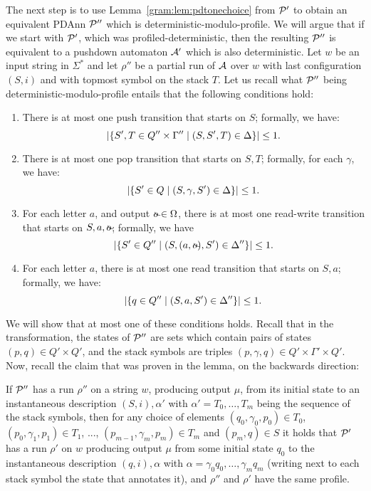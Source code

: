 The next step is to use Lemma~\ref{gram:lem:pdtonechoice} from $\mathcal{P}'$ to obtain an equivalent PDAnn $\mathcal{P}''$ which is deterministic-modulo-profile. We will argue that if we start with $\mathcal{P}'$, which was profiled-deterministic, then the resulting $\mathcal{P}''$ is equivalent to a pushdown automaton $\mathcal{A}'$ which is also deterministic. Let $w$ be an input string in $\Sigma^*$ and let $\rho''$ be a partial run of $\mathcal{A}$ over $w$ with last configuration $(S, i)$ and with topmost symbol on the stack $T$. Let us recall what $\mathcal{P}''$ being deterministic-modulo-profile entails that the following conditions hold:
  \begin{enumerate}
	\item There is at most one push transition that
	starts on $S$; formally, we have:
        \[\left|\{S', T \in Q'' \times \Gamma'' \mid
                (S, S', T) \in \Delta\}\right| \leq 1.\]
	\item There is at most
	one pop transition that starts on $S,T$; formally, for each $\gamma$, we
        have:
        \[\left|\{S'
                \in Q \mid (S, \gamma, S') \in \Delta\}\right| \leq 1.\]
	\item For each letter $a$, and output $\oout \in \Omega$, there is at most one read-write transition that starts on
          $S,a,\oout$; formally, we have \[\card{\{S' \in Q'' \mid (S,(a,\oout),S') \in \Delta''\}}
        \leq 1.\]
	\item For each letter $a$, there is at most one read transition that starts on
          $S,a$; formally, we have: \[\left|\{q \in Q'' \mid (S,a,S') \in \Delta''\}\right|
        \leq 1.\]
\end{enumerate}
We will show that at most one of these conditions holds. Recall that in the transformation, the states of $\mathcal{P}''$ are sets which contain pairs of states $(p,q)\in Q'\times Q'$, and the stack symbols are triples $(p, \gamma, q)\in Q'\times\Gamma' \times Q'$. Now, recall the claim that was proven in the lemma, on the backwards direction:

If $\mathcal{P}''$ has a run $\rho''$ on a string $w$, producing output $\mu$, from its initial state to an instantaneous
description $(S, i), \alpha'$ with $\alpha' =
T_0, \ldots, T_m$ being the sequence of the stack
symbols, then for any choice of elements $(q_0, \gamma_0, p_0) \in T_0$,
$(p_0, \gamma_1, p_1) \in T_1$, ..., $(p_{m-1}, \gamma_m, p_m) \in T_m$
and $(p_m, q) \in S$ it holds that $\mathcal{P}'$ has a run $\rho'$ on $w$ producing output $\mu$
from some initial state $q_0$ to the instantaneous description $(q, i), \alpha$ with
$\alpha = \gamma_0 q_0, \ldots, \gamma_m q_m$ (writing next to each
stack symbol the state that annotates it), and $\rho''$ and $\rho'$ have
the same profile. 

